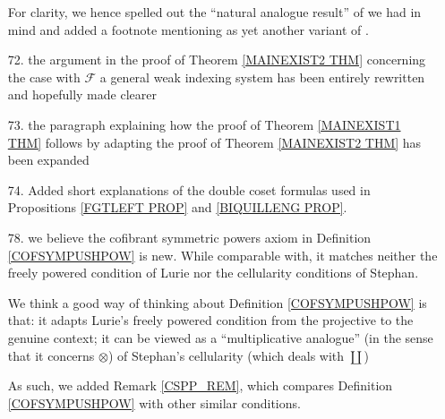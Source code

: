 \documentclass{article}
\begin{document}
\begin{itemize}
        
	For clarity, we hence spelled out the ``natural analogue result'' of \cite[Thm. 11.3.2]{Hi03} we had in mind
	and added a footnote mentioning \cite[Thm. 2]{Spi01} as yet another variant of \cite[Thm. 11.3.2]{Hi03}.
	
	
	
        
	\item[72.] the argument in the proof of Theorem \ref{MAINEXIST2 THM}
	concerning the case with $\mathcal{F}$
	a general weak indexing system has been entirely rewritten and hopefully made clearer
	
	\item[73.] the paragraph explaining how the proof of 
	Theorem \ref{MAINEXIST1 THM}
	follows by adapting the proof of 
	Theorem \ref{MAINEXIST2 THM}
	has been expanded


	\item[74.] Added short explanations of the double coset formulas used in 
	Propositions \ref{FGTLEFT PROP} and \ref{BIQUILLENG PROP}.

	\item[78.]
	we believe the cofibrant symmetric powers axiom in 
	Definition \ref{COFSYMPUSHPOW} is new.
	While comparable with,
	it matches neither the freely powered condition of Lurie nor 
	the cellularity conditions of Stephan.
	
	We think a good way of thinking about 
	Definition \ref{COFSYMPUSHPOW} is that: 
	it adapts Lurie's freely powered condition from the 
	projective to the genuine context;
	it can be viewed as a ``multiplicative analogue''
	(in the sense that it concerns $\otimes$) of 
	Stephan's cellularity (which deals with $\coprod$)
	
	As such, we added Remark \ref{CSPP_REM}, which compares
	Definition \ref{COFSYMPUSHPOW}
	with other similar conditions.



\end{itemize}
\end{document}
